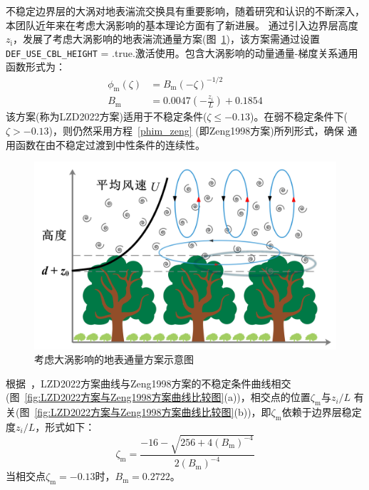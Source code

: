 不稳定边界层的大涡对地表湍流交换具有重要影响，随着研究和认识的不断深入，本团队近年来在考虑大涡影响的基本理论方面有了新进展。\citet{liu2019further,liu2022surface}
通过引入边界层高度$z_{\mathrm {i}}$，发展了考虑大涡影响的地表湍流通量方案(图~\ref{fig:LZD2022方案概念图})，该方案需通过设置\texttt{DEF\_USE\_CBL\_HEIGHT} = .true.激活使用。包含大涡影响的动量通量-梯度关系通用函数形式为：
\begin{equation}
  \begin{aligned}
    \phi_{\mathrm{m}}(\zeta) &= B_{\mathrm{m}} (-\zeta)^{-1/2} \\[1ex]
    B_{\mathrm{m}} &= 0.0047(-\frac{z_{i}}{L})+0.1854
  \end{aligned}
\end{equation}
该方案(称为LZD2022方案)适用于不稳定条件($\zeta \leqslant -0.13$)。在弱不稳定条件下($\zeta > -0.13$)，则仍然采用方程~\eqref{phim_zeng} (即Zeng1998方案)所列形式，确保
通用函数在由不稳定过渡到中性条件的连续性。
{
  \begin{figure}[htbp]
    \centering
    \includegraphics[scale=0.7]{Figures/地表湍流交换过程/LZD2022方案概念图.jpg}
    \caption{考虑大涡影响的地表通量方案示意图}
    \label{fig:LZD2022方案概念图}
  \end{figure}
}

根据~\citet{liu2023referenceheight}，LZD2022方案曲线与Zeng1998方案的不稳定条件曲线相交(图~\ref{fig:LZD2022方案与Zeng1998方案曲线比较图}(a))，相交点的位置$\zeta_{\mathrm{m}}$与${z_{i}}/{L}$
有关(图~\ref{fig:LZD2022方案与Zeng1998方案曲线比较图}(b))，即$\zeta_{\mathrm{m}}$依赖于边界层稳定度${z_{i}}/{L}$，形式如下：
\begin{equation}
  \zeta_{\mathrm{m}}=\frac{-16-\sqrt{256+4 \left(B_{\mathrm{m}}\right)^{-4}}}{2 \left(B_{\mathrm{m}}\right)^{-4}}
\end{equation}
当相交点$\zeta_{\mathrm{m}}=-0.13$时，$B_{\mathrm{m}}=0.2722$。


